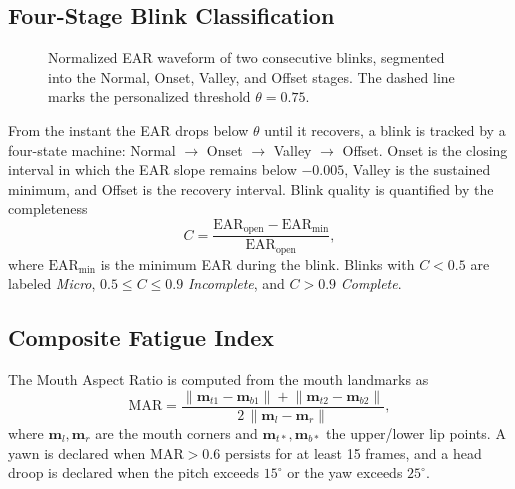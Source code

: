 \documentclass{IEEE_lsens}
\begin{document}
\subsection{Four-Stage Blink Classification}
\begin{figure}[!t]
\centering
{}
\caption{Normalized EAR waveform of two consecutive blinks, segmented into
the Normal, Onset, Valley, and Offset stages. The dashed line marks the
personalized threshold $\theta=0.75$.}
\label{fig_wave}
\end{figure}
From the instant the EAR drops below $\theta$ until it recovers, a blink is
tracked by a four-state machine: Normal $\rightarrow$ Onset $\rightarrow$
Valley $\rightarrow$ Offset. Onset is the closing interval in which the EAR
slope remains below $-0.005$, Valley is the sustained minimum, and Offset is
the recovery interval. Blink quality is quantified by the completeness
\begin{equation}
C=\frac{\mathrm{EAR}_{\text{open}}-\mathrm{EAR}_{\min}}{\mathrm{EAR}_{\text{open}}},
\label{eq_complete}
\end{equation}
where $\mathrm{EAR}_{\min}$ is the minimum EAR during the blink. Blinks with
$C<0.5$ are labeled \textit{Micro}, $0.5\le C\le 0.9$ \textit{Incomplete},
and $C>0.9$ \textit{Complete}.

\subsection{Composite Fatigue Index}
The Mouth Aspect Ratio is computed from the mouth landmarks as
\begin{equation}
\mathrm{MAR}=\frac{\lVert \bm{m}_{t1}-\bm{m}_{b1}\rVert+\lVert \bm{m}_{t2}-\bm{m}_{b2}\rVert}
{2\,\lVert \bm{m}_{l}-\bm{m}_{r}\rVert},
\label{eq_mar}
\end{equation}
where $\bm{m}_{l},\bm{m}_{r}$ are the mouth corners and
$\bm{m}_{t\ast},\bm{m}_{b\ast}$ the upper/lower lip points. A yawn is declared
when $\mathrm{MAR}>0.6$ persists for at least 15 frames, and a head droop is
declared when the pitch exceeds $15^{\circ}$ or the yaw exceeds $25^{\circ}$.
\end{document}
